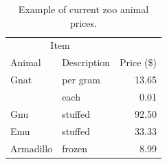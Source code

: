 \begin{table}[h]\label{tab:zoo_animal_prices}
\begin{center}\begin{tabular}{llr}
\toprule
\multicolumn{2}{c}{Item} \\
\cmidrule(r){1-2}
Animal    & Description & Price (\$) \\
\midrule
Gnat      & per gram    & 13.65      \\
          &    each     & 0.01       \\
Gnu       & stuffed     & 92.50      \\
Emu       & stuffed     & 33.33      \\
Armadillo & frozen      & 8.99       \\
\bottomrule
\end{tabular}\end{center}
\caption{Example of current zoo animal prices.}
\end{table}

\kant[9]

